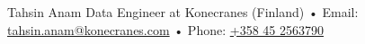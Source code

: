 

\begin{cvskills}

  \cvskill
    {Tahsin Anam} %
    {Data Engineer at Konecranes (Finland) • Email: \underline{tahsin.anam@konecranes.com} • Phone: \underline{+358 45 2563790} }%
\end{cvskills}
